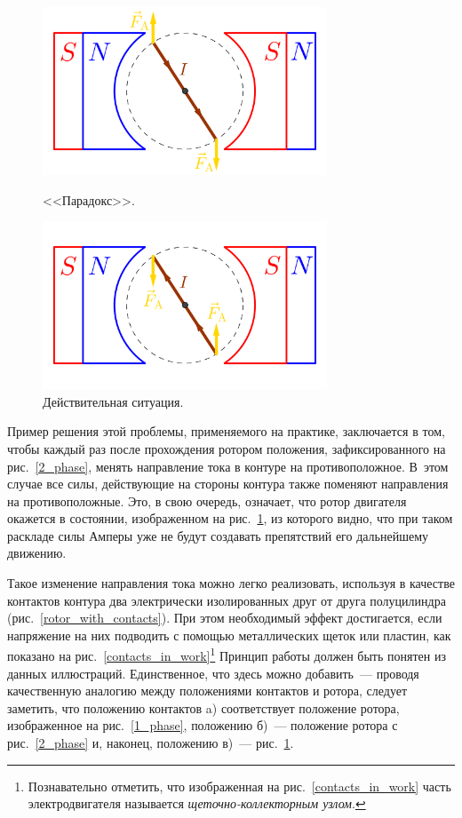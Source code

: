 \documentclass[12pt, a4paper, openany]{extarticle}
\begin{document}
\begin{figure}[h]
	\begin{center}
		\begin{minipage}[h]{0.49\linewidth}
			\centering\includegraphics[height=5cm]{phase_3.png}
			\caption{<<Парадокс>>.}
			\label{3_phase} 
		\end{minipage}
		\hfill 
		\begin{minipage}[h]{0.49\linewidth}
			\centering\includegraphics[height=5cm]{phase_4.png}
			\caption{Действительная ситуация.}
			\label{4_phase}
		\end{minipage}
	\end{center}
\end{figure}

Пример решения этой проблемы, применяемого на практике, заключается в том, чтобы каждый раз после прохождения ротором положения, зафиксированного на рис.~\ref{2_phase}, менять направление тока в контуре на противоположное. 
В~этом случае все силы, действующие на стороны контура также поменяют направления на противоположные. 
Это, в свою очередь, означает, что ротор двигателя окажется в состоянии, изображенном на рис.~\ref{4_phase}, из которого видно, что при таком раскладе силы Амперы уже не будут создавать препятствий его дальнейшему движению.

Такое изменение направления тока можно легко реализовать, используя в качестве контактов контура два электрически изолированных друг от друга полуцилиндра (рис.~\ref{rotor_with_contacts}).
При этом необходимый эффект достигается, если напряжение на них подводить с помощью металлических щеток или пластин, как показано на рис.~\ref{contacts_in_work}\footnote{Познавательно отметить, что изображенная на рис.~\ref{contacts_in_work} часть электродвигателя называется \textit{щеточно-коллекторным узлом}.} 
Принцип работы должен быть понятен из данных иллюстраций. 
Единственное, что здесь можно добавить~--- проводя качественную аналогию между положениями контактов и ротора, следует заметить, что положению контактов a) соответствует положение ротора, изображенное на рис.~\ref{1_phase}, положению б)~--- положение ротора с рис.~\ref{2_phase} и, наконец, положению в)~--- рис.~\ref{4_phase}.
\end{document}
